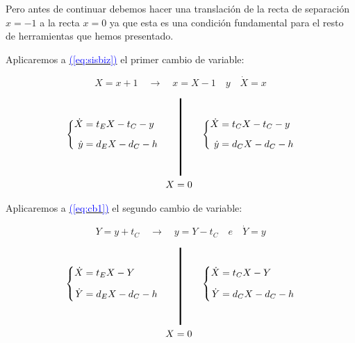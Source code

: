 \documentclass[12pt,a4paper]{report} %
\newcommand{\eref}[1]{\hyperref[#1]{\textcolor{blue}{(\ref*{#1})}}}
\newcommand{\eref}[1]{\hyperref[#1]{\textcolor{blue}{\textit{(\ref*{#1})}}}}
\begin{document}
	 \vspace{0.5cm}\noindent Pero antes de continuar debemos hacer una translación de la recta de separación $x=-1$ a la recta $x=0$ ya que esta es una condición fundamental para el resto de herramientas que hemos presentado.
	
	\newpage
	
	\vspace{0.5cm}\noindent Aplicaremos a \eref{eq:sisbiz} el primer cambio de variable:
	
	\begin{equation}
		\label{eq:cambioo1}
		X=x+1 \quad \longrightarrow \quad x=X-1 \quad \textit{y} \quad \dot{X}=x
	\end{equation}
	
	\begin{equation}
		\label{eq:cb1}
		\begin{gathered}
			\left\{
			\begin{aligned}
				\dot{X}&=t_EX-t_C-y
				\\[2mm]
				\dot{y}&=d_EX-d_C-h
			\end{aligned}
			\right. \qquad 
			\rule[-40pt]{1.5pt}{80pt} \qquad 
			\left\{
			\begin{aligned}
				\dot{X}&=t_CX-t_C-y
				\\[2mm]
				\dot{y}&=d_CX-d_C-h
			\end{aligned}
			\right. \\  \!\! X=0
		\end{gathered}
	\end{equation}\smallskip
	
	\vspace{0.5cm}\noindent Aplicaremos a \eref{eq:cb1} el segundo cambio de variable:
	
	\begin{equation}
		\label{eq:cambioo2}
		Y=y+t_C \quad \longrightarrow \quad y=Y-t_C \quad \textit{e} \quad \dot{Y}=y
	\end{equation}
	
	\begin{equation}
		\label{eq:cb2}
		\begin{gathered}
			\left\{
			\begin{aligned}
				\dot{X}&=t_EX-Y
				\\[2mm]
				\dot{Y}&=d_EX-d_C-h
			\end{aligned}
			\right. \qquad 
			\rule[-40pt]{1.5pt}{80pt} \qquad 
			\left\{
			\begin{aligned}
				\dot{X}&=t_CX-Y
				\\[2mm]
				\dot{Y}&=d_CX-d_C-h
			\end{aligned}
			\right. \\  \!\! X=0
		\end{gathered}
	\end{equation}\smallskip
	
\end{document}
